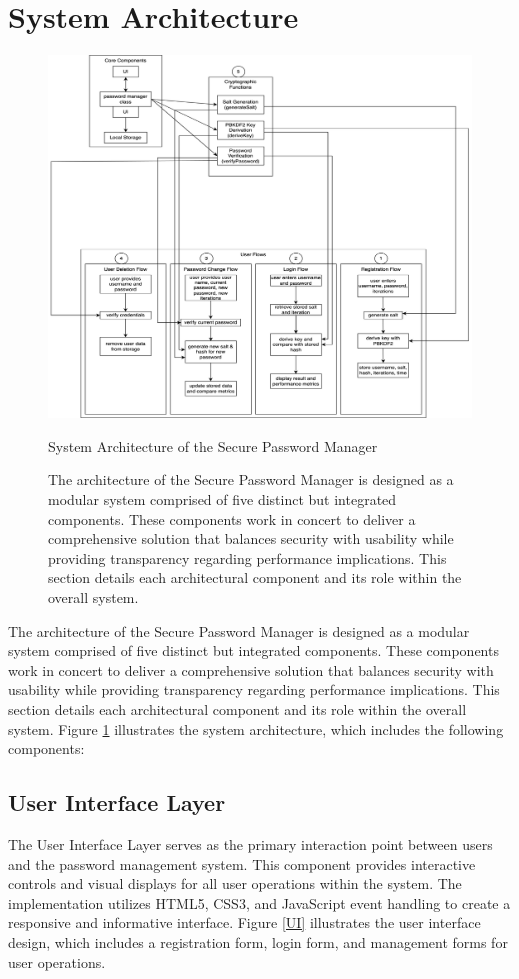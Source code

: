 \documentclass[11pt,a4paper]{article}
\begin{document}
\section{System Architecture}
\begin{figure}
    \centering
    \includegraphics[width=1\linewidth]{images/system_design.png}
    \caption{System Architecture of the Secure Password Manager}
    \caption*{The architecture of the Secure Password Manager is designed as a modular system comprised of five distinct but integrated components. These components work in concert to deliver a comprehensive solution that balances security with usability while providing transparency regarding performance implications. This section details each architectural component and its role within the overall system.}
    \label{Architecture}
\end{figure}
The architecture of the Secure Password Manager is designed as a modular system comprised of five distinct but integrated components. These components work in concert to deliver a comprehensive solution that balances security with usability while providing transparency regarding performance implications. This section details each architectural component and its role within the overall system. Figure \ref{Architecture} illustrates the system architecture, which includes the following components:

\subsection{User Interface Layer}
The User Interface Layer serves as the primary interaction point between users and the password management system. This component provides interactive controls and visual displays for all user operations within the system. The implementation utilizes HTML5, CSS3, and JavaScript event handling to create a responsive and informative interface. Figure \ref{UI} illustrates the user interface design, which includes a registration form, login form, and management forms for user operations.
\end{document}
